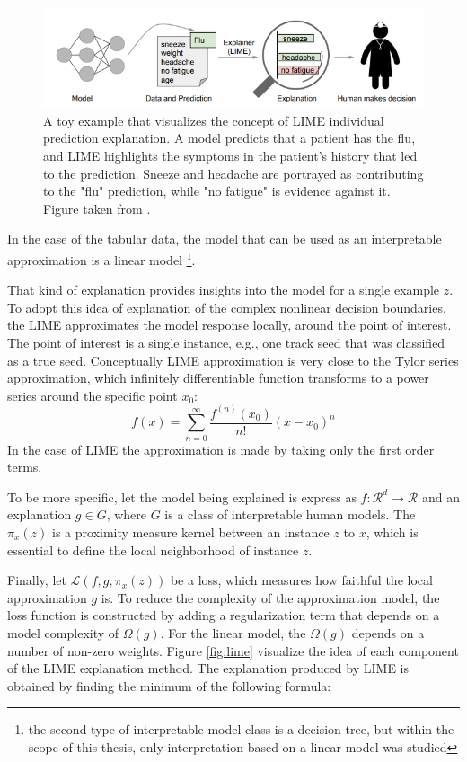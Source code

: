 \begin{figure}[!htb]
\centering
\includegraphics{figures/lime_doctor.PNG}
\caption{A toy example that visualizes the concept of LIME individual prediction explanation. A model predicts that a patient has the flu, and LIME highlights the symptoms in the patient's history that led to the prediction. Sneeze and headache are portrayed as contributing to the "flu" prediction, while "no fatigue" is evidence against it. Figure taken from \cite{lime}.
\label{fig:LIME_doctor}}
\end{figure} 


In the case of the tabular data, the model that can be used as an interpretable approximation is a linear model \footnote{the second type of interpretable model class is a decision tree, but within the scope of this thesis, only interpretation based on a linear model was studied}. 

   That kind of explanation provides insights into the model for a single example $z$. To adopt this idea of explanation of the complex nonlinear decision boundaries, the LIME approximates the model response locally, around the point of interest. The point of interest is a single instance, e.g., one track seed that was classified as a true seed.  
Conceptually LIME approximation is very close to the Tylor series approximation, which infinitely differentiable function transforms to a power series around the specific point $x_0$: 
\begin{equation}
    f(x) = \sum_{n=0}^{\infty} \frac{f^{(n)}(x_0)}{n!} (x-x_0)^n
\end{equation}
In the case of LIME the approximation is made by taking only the first order terms.  
 
To be more specific, let the model being explained is express as $f: \mathcal{R}^{d}\rightarrow  \mathcal{R} $ and an explanation $g \in G$, where $G$ is a class of interpretable human models. The $\pi_x(z)$ is a proximity measure kernel between an instance $z$ to $x$, which is essential to define the local neighborhood of instance $z$.

Finally, let $\mathcal{L}(f,g,\pi_x(z))$ be a loss, which measures how faithful the local approximation $g$ is. 
To reduce the complexity of the approximation model, the loss function is constructed by adding a regularization term that depends on a model complexity of $\Omega(g)$. For the linear model, the $\Omega(g)$ depends on a number of non-zero weights. Figure \ref{fig:lime} visualize the idea of each component of the LIME explanation method. 
The explanation produced by LIME is obtained by finding the minimum of the following formula: 

